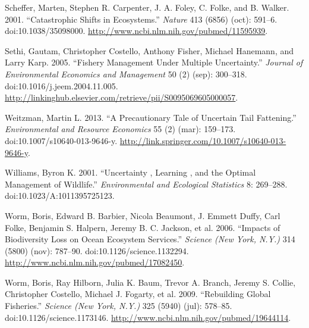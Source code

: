 \documentclass[author-year, review]{elsarticle} %
\begin{document}
Scheffer, Marten, Stephen R. Carpenter, J. A. Foley, C. Folke, and B.
Walker. 2001. ``Catastrophic Shifts in Ecosystems.'' \emph{Nature} 413
(6856) (oct): 591--6. doi:10.1038/35098000.
\url{http://www.ncbi.nlm.nih.gov/pubmed/11595939}.

Sethi, Gautam, Christopher Costello, Anthony Fisher, Michael Hanemann,
and Larry Karp. 2005. ``Fishery Management Under Multiple Uncertainty.''
\emph{Journal of Environmental Economics and Management} 50 (2) (sep):
300--318. doi:10.1016/j.jeem.2004.11.005.
\url{http://linkinghub.elsevier.com/retrieve/pii/S0095069605000057}.

Weitzman, Martin L. 2013. ``A Precautionary Tale of Uncertain Tail
Fattening.'' \emph{Environmental and Resource Economics} 55 (2) (mar):
159--173. doi:10.1007/s10640-013-9646-y.
\url{http://link.springer.com/10.1007/s10640-013-9646-y}.

Williams, Byron K. 2001. ``Uncertainty , Learning , and the Optimal
Management of Wildlife.'' \emph{Environmental and Ecological Statistics}
8: 269--288. doi:10.1023/A:1011395725123.

Worm, Boris, Edward B. Barbier, Nicola Beaumont, J. Emmett Duffy, Carl
Folke, Benjamin S. Halpern, Jeremy B. C. Jackson, et al. 2006. ``Impacts
of Biodiversity Loss on Ocean Ecosystem Services.'' \emph{Science (New
York, N.Y.)} 314 (5800) (nov): 787--90. doi:10.1126/science.1132294.
\url{http://www.ncbi.nlm.nih.gov/pubmed/17082450}.

Worm, Boris, Ray Hilborn, Julia K. Baum, Trevor A. Branch, Jeremy S.
Collie, Christopher Costello, Michael J. Fogarty, et al. 2009.
``Rebuilding Global Fisheries.'' \emph{Science (New York, N.Y.)} 325
(5940) (jul): 578--85. doi:10.1126/science.1173146.
\url{http://www.ncbi.nlm.nih.gov/pubmed/19644114}.
\end{document}
